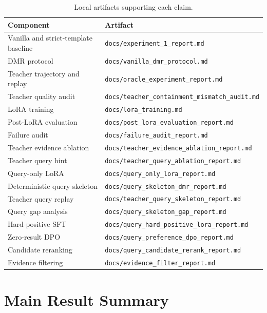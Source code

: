 \documentclass[11pt]{article}
\newcommand{\tool}[1]{\texttt{#1}}
\begin{document}
\begin{table}[t]
\centering
\small
\begin{tabularx}{\textwidth}{ll}
\toprule
\textbf{Component} & \textbf{Artifact} \\
\midrule
Vanilla and strict-template baseline & \tool{docs/experiment\_1\_report.md} \\
DMR protocol & \tool{docs/vanilla\_dmr\_protocol.md} \\
Teacher trajectory and replay & \tool{docs/oracle\_experiment\_report.md} \\
Teacher quality audit & \tool{docs/teacher\_containment\_mismatch\_audit.md} \\
LoRA training & \tool{docs/lora\_training.md} \\
Post-LoRA evaluation & \tool{docs/post\_lora\_evaluation\_report.md} \\
Failure audit & \tool{docs/failure\_audit\_report.md} \\
Teacher evidence ablation & \tool{docs/teacher\_evidence\_ablation\_report.md} \\
Teacher query hint & \tool{docs/teacher\_query\_ablation\_report.md} \\
Query-only LoRA & \tool{docs/query\_only\_lora\_report.md} \\
Deterministic query skeleton & \tool{docs/query\_skeleton\_dmr\_report.md} \\
Teacher query replay & \tool{docs/teacher\_query\_skeleton\_report.md} \\
Query gap analysis & \tool{docs/query\_skeleton\_gap\_report.md} \\
Hard-positive SFT & \tool{docs/query\_hard\_positive\_lora\_report.md} \\
Zero-result DPO & \tool{docs/query\_preference\_dpo\_report.md} \\
Candidate reranking & \tool{docs/query\_candidate\_rerank\_report.md} \\
Evidence filtering & \tool{docs/evidence\_filter\_report.md} \\
\bottomrule
\end{tabularx}
\caption{Local artifacts supporting each claim.}
\label{tab:artifacts}
\end{table}

\section{Main Result Summary}
\end{document}
